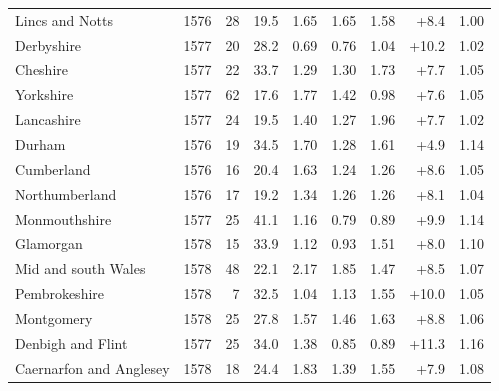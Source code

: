 \documentclass[11pt,a4paper]{article}
\begin{document}
{\begin{longtable}{lrrrrrrrr}
Lincs and Notts & 1576 & 28 & 19.5 & 1.65 & 1.65 & 1.58 & +8.4 & 1.00 \\
Derbyshire & 1577 & 20 & 28.2 & 0.69 & 0.76 & 1.04 & +10.2 & 1.02 \\
Cheshire & 1577 & 22 & 33.7 & 1.29 & 1.30 & 1.73 & +7.7 & 1.05 \\
Yorkshire & 1577 & 62 & 17.6 & 1.77 & 1.42 & 0.98 & +7.6 & 1.05 \\
Lancashire & 1577 & 24 & 19.5 & 1.40 & 1.27 & 1.96 & +7.7 & 1.02 \\
Durham & 1576 & 19 & 34.5 & 1.70 & 1.28 & 1.61 & +4.9 & 1.14 \\
Cumberland & 1576 & 16 & 20.4 & 1.63 & 1.24 & 1.26 & +8.6 & 1.05 \\
Northumberland & 1576 & 17 & 19.2 & 1.34 & 1.26 & 1.26 & +8.1 & 1.04 \\
Monmouthshire & 1577 & 25 & 41.1 & 1.16 & 0.79 & 0.89 & +9.9 & 1.14 \\
Glamorgan & 1578 & 15 & 33.9 & 1.12 & 0.93 & 1.51 & +8.0 & 1.10 \\
Mid and south Wales & 1578 & 48 & 22.1 & 2.17 & 1.85 & 1.47 & +8.5 & 1.07 \\
Pembrokeshire & 1578 & 7 & 32.5 & 1.04 & 1.13 & 1.55 & +10.0 & 1.05 \\
Montgomery & 1578 & 25 & 27.8 & 1.57 & 1.46 & 1.63 & +8.8 & 1.06 \\
Denbigh and Flint & 1577 & 25 & 34.0 & 1.38 & 0.85 & 0.89 & +11.3 & 1.16 \\
Caernarfon and Anglesey & 1578 & 18 & 24.4 & 1.83 & 1.39 & 1.55 & +7.9 & 1.08 \\
\bottomrule\end{longtable}}
\end{document}
